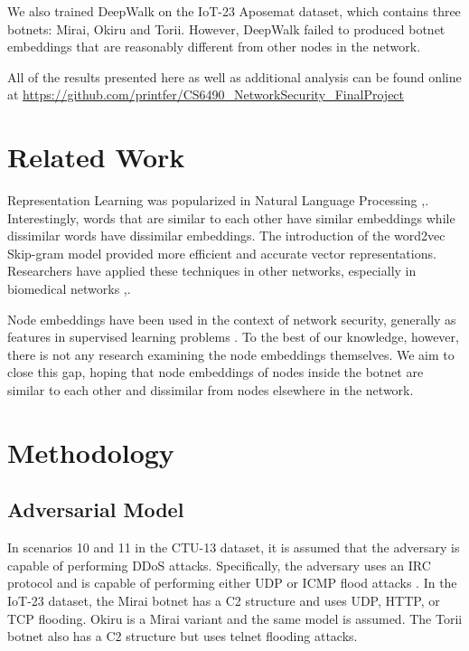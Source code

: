 \documentclass[10pt]{article}
\begin{document}
\begin{multicols}{2}
We also trained DeepWalk on the IoT-23 Aposemat \cite{IoT-23} dataset, which contains three botnets: Mirai, Okiru and Torii. However, DeepWalk failed to produced botnet embeddings that are reasonably different from other nodes in the network.

All of the results presented here as well as additional analysis can be found online at \url{https://github.com/printfer/CS6490_NetworkSecurity_FinalProject}

\section{Related Work}

Representation Learning was popularized in Natural Language Processing \cite{Camacho},\cite{Madelbaum}. Interestingly, words that are similar to each other have similar embeddings while dissimilar words have dissimilar embeddings. The introduction of the word2vec Skip-gram model \cite{Mikolov} provided more efficient and accurate vector representations.  Researchers have applied these techniques in other networks, especially in biomedical networks \cite{Perkins},\cite{Yue}.

Node embeddings have been used in the context of network security, generally as features in supervised learning problems \cite{Skorniakov}. To the best of our knowledge, however, there is not any research examining the node embeddings themselves. We aim to close this gap, hoping that node embeddings of nodes inside the botnet are similar to each other and dissimilar from nodes elsewhere in the network.

\section{Methodology}

\subsection{Adversarial Model}
In scenarios 10 and 11 in the CTU-13 dataset, it is assumed that the adversary is capable of performing DDoS attacks. Specifically, the adversary uses an IRC protocol and is capable of performing either UDP or ICMP flood attacks \cite{Garcia}. In the IoT-23 dataset, the Mirai botnet has a C2 structure and uses UDP, HTTP, or TCP flooding. Okiru is a Mirai variant and the same model is assumed. The Torii botnet also has a C2 structure but uses telnet flooding attacks.


\end{multicols}
\end{document}
